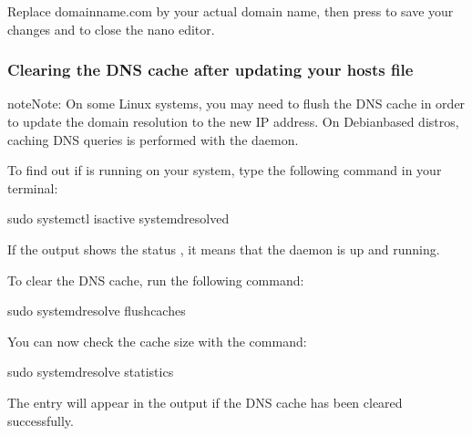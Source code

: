 \documentclass[a4paper,10pt,english,openany,oneside]{sphinxmanual}
\begin{document}
\begin{sloppypar}
\sphinxAtStartPar
Replace domainname.com by your actual domain name, then press  to save your changes and  to close the nano editor.


\subsubsection{Clearing the DNS cache after updating your hosts file}
\label{\detokenize{joomla-to-vps:clearing-the-dns-cache-after-updating-your-hosts-file}}
\begin{sphinxadmonition}{note}{Note:}
\sphinxAtStartPar
On some Linux systems, you may need to flush the DNS cache in order to update the domain resolution to the new IP address. On Debian\sphinxhyphen{}based distros, caching DNS queries is performed with the  daemon.
\end{sphinxadmonition}

\sphinxAtStartPar
To find out if  is running on your system, type the following command in your terminal:

\begin{sphinxVerbatim}[commandchars=\\\{\}]
\PYGZdl{} sudo systemctl is\PYGZhy{}active systemd\PYGZhy{}resolved
\end{sphinxVerbatim}

\sphinxAtStartPar
If the output shows the status , it means that the daemon is up and running.

\sphinxAtStartPar
To clear the DNS cache, run the following command:

\begin{sphinxVerbatim}[commandchars=\\\{\}]
\PYGZdl{} sudo systemd\PYGZhy{}resolve \PYGZhy{}\PYGZhy{}flush\PYGZhy{}caches
\end{sphinxVerbatim}

\sphinxAtStartPar
You can now check the cache size with the command:

\begin{sphinxVerbatim}[commandchars=\\\{\}]
\PYGZdl{} sudo systemd\PYGZhy{}resolve \PYGZhy{}\PYGZhy{}statistics
\end{sphinxVerbatim}

\sphinxAtStartPar
The entry  will appear in the output if the DNS cache has been cleared successfully.



\end{sloppypar}
\end{document}
